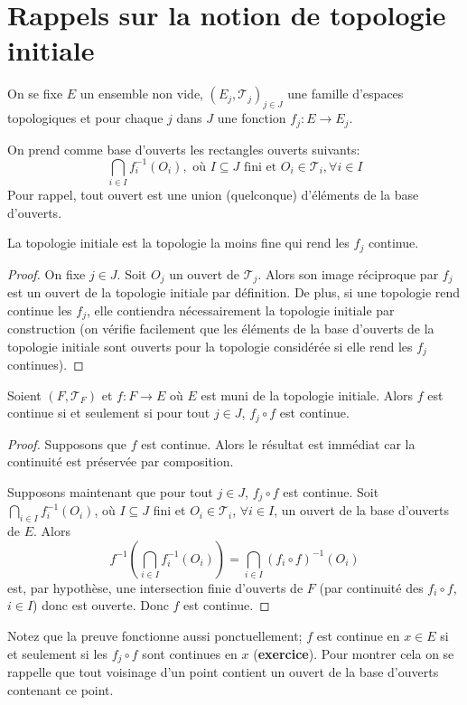 \section{Rappels sur la notion de topologie initiale}
On se fixe $E$ un ensemble non vide, $(E_j, \mathcal{T}_j)_{j\in J}$ une famille
d'espaces topologiques et pour chaque $j$ dans $J$ une fonction
$f_j: E\to E_j$.
\begin{df}\label{init:df}
  On prend comme base d'ouverts les \og rectangles
  ouverts \fg{} suivants:
  \begin{equation*}
    \bigcap_{i\in I}f^{-1}_i(O_i), \mbox{ où }I\subseteq J \mbox{ fini et }
    O_i\in\mathcal{T}_i, \forall i \in I
  \end{equation*}
  Pour rappel, tout ouvert est une union (quelconque) d'éléments
  de la base d'ouverts.
\end{df}

\begin{prop}
  La topologie initiale est la topologie la moins fine
  qui rend les $f_j$ continue.
\end{prop}

\begin{proof}
  On fixe $j\in J$. Soit $O_j$ un ouvert de $\mathcal{T}_j$.
  Alors son image réciproque par $f_j$ est un ouvert
  de la topologie initiale par définition. De plus,
  si une topologie rend continue les $f_j$, elle
  contiendra nécessairement la topologie initiale
  par construction (on vérifie facilement que les
  éléments de la base d'ouverts  de la topologie initiale
  sont ouverts pour la topologie considérée si elle
  rend les $f_j$ continues).
\end{proof}

\begin{prop}\label{init:cont}
  Soient $(F, \mathcal{T}_F)$ et $f: F\to E$ où $E$ est
  muni de la topologie initiale. Alors $f$ est
  continue si et seulement si pour tout $j\in J$,
  $f_j\circ f$ est continue.
\end{prop}

\begin{proof}
  Supposons que $f$ est continue. Alors le résultat est
  immédiat car la continuité est préservée par composition.

  Supposons maintenant que pour tout $j\in J$, $f_j\circ f$
  est continue. Soit $\bigcap_{i\in I}f^{-1}_i(O_i)$,
  où $I\subseteq J$ fini et $O_i\in\mathcal{T}_i$, $\forall i \in I$,
  un ouvert de la base d'ouverts de $E$. Alors
  $$f^{-1}\left(\bigcap_{i\in I}f^{-1}_i(O_i)\right) =
  \bigcap_{i\in I} \left(f_i\circ f\right)^{-1}(O_i)$$
  est, par hypothèse, une intersection finie d'ouverts
  de $F$ (par continuité des $f_i\circ f$, $i\in I$) donc est
  ouverte. Donc $f$ est continue.
\end{proof}
Notez que la preuve fonctionne aussi ponctuellement;
$f$ est continue en $x\in E$ si et seulement si
les $f_j\circ f$ sont continues en $x$ (\textbf{exercice}).
Pour montrer cela
on se rappelle que tout voisinage d'un point contient
un ouvert de la base d'ouverts contenant ce point.

